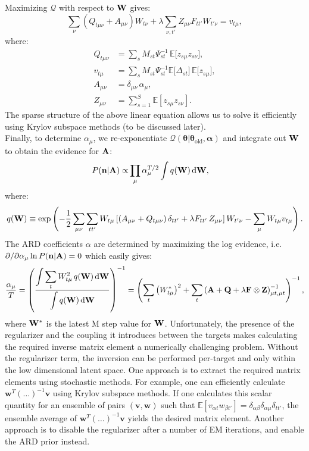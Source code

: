 \documentclass[nofootinbib,amssymb,amsmath]{revtex4}
\newcommand{\vn}{{\bf n}}
\newcommand{\vQ}{{\bf Q}}
\newcommand{\vW}{{\bf W}}
\newcommand{\vF}{{\bf F}}
\newcommand{\vZ}{{\bf Z}}
\newcommand{\vtheta}{{\boldsymbol \theta}}
\newcommand{\valpha}{{\boldsymbol \alpha}}
\newcommand{\vA}{{\bf A}}
\newcommand{\EE}{\mathbb{E}}
\begin{document}
\noindent Maximizing $\mathcal{Q}$ with respect to $\vW$ gives:
\begin{equation}\label{eq:W_eq_reg}
\sum_{\nu} \left(Q_{t\mu\nu} + A_{\mu\nu}\right) W_{t\nu} + \lambda \sum_{\nu,t'} Z_{\mu\nu} F_{tt'} W_{t'\nu} = v_{t\mu},
\end{equation}
where:
\begin{align}
Q_{t\mu\nu} &= \sum_s M_{st} \Psi_{st}^{-1} \, \EE\big[z_{s\mu} z_{s\nu}\big],\nonumber\\
v_{t\mu} &= \sum_s M_{st} \Psi_{st}^{-1} \EE\big[\Delta_{st}\big]\, \EE\big[z_{s\mu}\big],\nonumber\\
A_{\mu\nu} &= \delta_{\mu\nu}\,\alpha_{\mu},\nonumber\\
Z_{\mu\nu} &= \sum_{s=1}^S \EE[z_{s\mu} z_{s\nu}].
\end{align}
The sparse structure of the above linear equation allows us to solve it efficiently using Krylov subspace methods (to be discussed later).\\

\noindent Finally, to determine $\alpha_\mu$, we re-exponentiate $\mathcal{Q}(\vtheta|\vtheta_\mathrm{old}, \valpha)$ and integrate out $\vW$ to obtain the evidence for $\vA$:
%
\begin{align}
P(\vn | \vA) \propto& \prod_\mu \alpha_\mu^{T/2} \int q(\vW) \, \mathrm{d} \vW,
\label{ARD_evidence}
\end{align}
where:
\begin{equation}
q(\vW) \equiv \exp\left(-\frac{1}{2} \sum_{\mu\nu} \sum_{tt'} W_{t \mu} \left[\left(A_{\mu\nu} + Q_{t\mu\nu}\right)\delta_{tt'} + \lambda F_{tt'}\,Z_{\mu\nu}\right] W_{t' \nu} - \sum_\mu W_{t\mu} v_{t\mu}\right).
\end{equation}
%
The ARD coefficients $\alpha$ are determined by maximizing the log evidence, i.e. $\partial/\partial \alpha_\mu \ln P(\vn | \vA) = 0$ which easily gives:
\begin{equation}
\frac{\alpha_\mu}{T} = \left(\frac{\displaystyle\int \sum_t W^2_{t\mu}\, q(\vW)\,\mathrm{d}\vW}{\displaystyle\int q(\vW) \, \mathrm{d}\vW}\right)^{-1} = \left(\sum_t \left(W_{t\mu}^*\right)^2 + \sum_t\left(\vA + \vQ + \lambda \vF \otimes \vZ \right)^{-1}_{\mu t, \mu t}\right)^{-1},
\end{equation}
where $\vW^*$ is the latest M step value for $\vW$. Unfortunately, the presence of the regularizer and the coupling it introduces between the targets makes calculating the required inverse matrix element a numerically challenging problem. Without the regularizer term, the inversion can be performed per-target and only within the low dimensional latent space. One approach is to extract the required matrix elements using stochastic methods. For example, one can efficiently calculate $\mathbf{w}^T \left(\ldots\right)^{-1} \mathbf{v}$ using Krylov subspace methods. If one calculates this scalar quantity for an ensemble of pairs $(\mathbf{v}, \mathbf{w})$ such that $\EE[v_{\alpha t} w_{\beta t'}] = \delta_{\alpha\beta}\delta_{\alpha\mu}\delta_{tt'}$, the ensemble average of $\mathbf{w}^T \left(\ldots\right)^{-1} \mathbf{v}$ yields the desired matrix element. Another approach is to disable the regularizer after a number of EM iterations, and enable the ARD prior instead.
\end{document}
